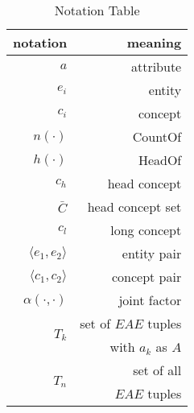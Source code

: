 \begin{table}[htbp]
  \centering
  \caption{Notation Table}
    \begin{tabular}{rr}
    \toprule
    notation & meaning \\
    \midrule
    $a$     & attribute \\
    $e_i$  & entity \\
    $c_i$  & concept \\
    $n(\cdot)$  & CountOf \\
    $h(\cdot)$ & HeadOf \\
    $c_h$  & head concept \\
    $\bar{C}$ &  head concept set\\
    $c_l$  & long concept \\
    $\langle e_1,e_2 \rangle$ & entity pair\\
    $\langle c_1,c_2 \rangle$ & concept pair\\
    $\alpha(\cdot,\cdot)$ & joint factor\\
    \multirow{2}[0]{*}{$T_k$} & set of $EAE$ tuples \\& with $a_k$ as $A$\\
    \multirow{2}[0]{*}{$T_n$} & set of all\\& $EAE$ tuples\\

    \bottomrule
    \end{tabular}%
  \label{tab:notation}%
\end{table}%


%
%
%
%
%
%
%
%
%
%
%
%
%


